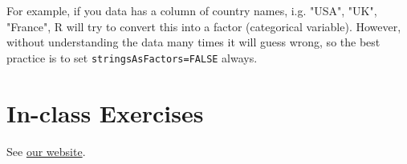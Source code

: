 \documentclass{article}\usepackage[]{graphicx}\usepackage[]{color}
\begin{document}
For example, if you data has a column of country names, i.g. "USA", "UK", "France", R will try to convert this into a factor (categorical variable). However, without understanding the data many times it will guess wrong, so the best practice is to set \verb`stringsAsFactors=FALSE` always.


\section{In-class Exercises}

See \href{http://polsci630.herokuapp.com/meetings}{our website}.
\end{document}
